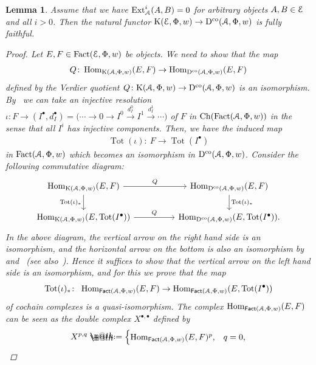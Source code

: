 \documentclass[pdftex]{sigma}%
\makeatletter
\newtheorem{lem}[dfn]{Lemma}
\newcommand*{\defeq}{\mathrel{\rlap{%
 \raisebox{0.3ex}{$\m@th\cdot$}}%
 \raisebox{-0.3ex}{$\m@th\cdot$}}%
 =}
\numberwithin{equation}{section}
\newcommand{\Ch}{\operatorname{Ch}}
\newcommand{\Fact}{\operatorname{Fact}}
\newcommand{\dgFact}{\operatorname{\sf{Fact}}}
\newcommand{\Hom}{\operatorname{Hom}}
\newcommand{\Ext}{\operatorname{Ext}}
\newcommand{\Tot}{\operatorname{Tot}}
\newcommand{\Dco}{\operatorname{D^{co}}}
\newcommand{\K}{\operatorname{K}}
\newcommand{\scrA}{\EuScript{A}}
\newcommand{\scrE}{\EuScript{E}}
\makeatother
\begin{document}
\begin{lem}\label{add ff}
Assume that we have $\Ext^i_{\scrA}(A,B)=0$ for arbitrary objects $A,B\in \scrE$ and all $i>0$. Then the natural functor $\K(\scrE,\Phi,w)\to \Dco(\scrA,\Phi,w)$ is fully faithful.
\begin{proof}
Let $E,F\in \Fact(\scrE,\Phi,w)$ be objects. We need to show that the map
\begin{gather*}
Q\colon\Hom_{{\rm K}(\scrA,\Phi,w)}(E,F)\to \Hom_{\Dco(\scrA,\Phi,w)}(E,F)
\end{gather*}
 defined by the Verdier quotient $Q\colon{\rm K}(\scrA,\Phi,w)\to\Dco(\scrA,\Phi,w)$ is an isomorphism. By~\cite[Proposition~2.19]{bdfik} we can take an injective resolution $\iota\colon F\to (I^{\bullet},d_{I}^{\bullet})=\big(\cdots\to0\to I^0\xrightarrow{d_{I}^0} I^1\xrightarrow{d_{I}^1} \cdots\big)$ of $F$ in $\Ch(\Fact(\scrA,\Phi,w))$ in the sense that all $I^i$ has injective components. Then, we have the induced map
 \begin{gather*}
 \Tot(\iota)\colon\ F\to\Tot(I^{\bullet})
 \end{gather*}
 in $\Fact(\scrA,\Phi,w)$ which becomes an isomorphism in $\Dco(\scrA,\Phi,w)$. Consider the following commutative diagram:
\[
\begin{tikzcd}
\Hom_{{\rm K}(\scrA,\Phi,w)}(E,F)\arrow[rr, "Q"]\arrow[d, "\Tot(\iota)_*"']&&\Hom_{\Dco(\scrA,\Phi,w)}(E,F)\arrow[d, "\Tot(\iota)_*"]\\
\Hom_{{\rm K}(\scrA,\Phi,w)}(E,\Tot(I^{\bullet}))\arrow[rr, "Q"]&&\Hom_{\Dco(\scrA,\Phi,w)}(E,\Tot(I^{\bullet})).
\end{tikzcd}
\]
In the above diagram, the vertical arrow on the right hand side is an isomorphism, and the horizontal arrow on the bottom is also an isomorphism by~\cite[Lemma~2.24]{bdfik} and~\cite[Proposition~B.2(I)]{ls} (see also~\cite[Remark 2.14]{ls}). Hence it suffices to show that the vertical arrow on the left hand side is an isomorphism, and for this we prove that the map
\begin{equation}\label{hom cpx}
\Tot(\iota)_*\colon\ \Hom_{\dgFact(\scrA,\Phi,w)}(E,F) \to\Hom_{\dgFact(\scrA,\Phi,w)}(E,\Tot(I^{\bullet}))
\end{equation}
of cochain complexes is a quasi-isomorphism. The complex $\Hom_{\dgFact(\scrA,\Phi,w)}(E,F)$ can be seen as the double complex $X^{\bullet,\bullet}$ defined by
\begin{equation*}
X^{p,q}\defeq\begin{cases}
\Hom_{\dgFact(\scrA,\Phi,w)}(E,F)^p, & q=0, \\

\end{cases}
\end{equation*}
\end{proof}
\end{lem}
\end{document}
